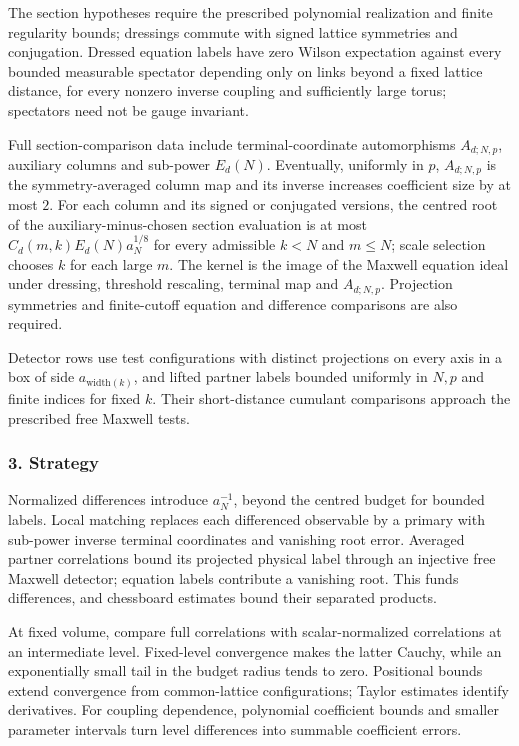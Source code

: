 \documentclass[
  letterpaper,
  11pt]{article}
\begin{document}
The section hypotheses require the prescribed polynomial realization and
finite regularity bounds; dressings commute with signed lattice
symmetries and conjugation. Dressed equation labels have zero Wilson
expectation against every bounded measurable spectator depending only on
links beyond a fixed lattice distance, for every nonzero inverse
coupling and sufficiently large torus; spectators need not be gauge
invariant.

Full section-comparison data include terminal-coordinate automorphisms
\(A_{d;N,p}\), auxiliary columns and sub-power \(E_d(N)\). Eventually,
uniformly in \(p\), \(A_{d;N,p}\) is the symmetry-averaged column map
and its inverse increases coefficient size by at most \(2\). For each
column and its signed or conjugated versions, the centred root of the
auxiliary-minus-chosen section evaluation is at most
\(C_d(m,k)E_d(N)a_N^{1/8}\) for every admissible \(k<N\) and \(m\le N\);
scale selection chooses \(k\) for each large \(m\). The kernel is the
image of the Maxwell equation ideal under dressing, threshold rescaling,
terminal map and \(A_{d;N,p}\). Projection symmetries and finite-cutoff
equation and difference comparisons are also required.

Detector rows use test configurations with distinct projections on every
axis in a box of side \(a_{\mathrm{width}(k)}\), and lifted partner
labels bounded uniformly in \(N,p\) and finite indices for fixed \(k\).
Their short-distance cumulant comparisons approach the prescribed free
Maxwell tests.

\subsubsection{3. Strategy}\label{strategy-14}

Normalized differences introduce \(a_N^{-1}\), beyond the centred budget
for bounded labels. Local matching replaces each differenced observable
by a primary with sub-power inverse terminal coordinates and vanishing
root error. Averaged partner correlations bound its projected physical
label through an injective free Maxwell detector; equation labels
contribute a vanishing root. This funds differences, and chessboard
estimates bound their separated products.

At fixed volume, compare full correlations with scalar-normalized
correlations at an intermediate level. Fixed-level convergence makes the
latter Cauchy, while an exponentially small tail in the budget radius
tends to zero. Positional bounds extend convergence from common-lattice
configurations; Taylor estimates identify derivatives. For coupling
dependence, polynomial coefficient bounds and smaller parameter
intervals turn level differences into summable coefficient errors.
\end{document}
